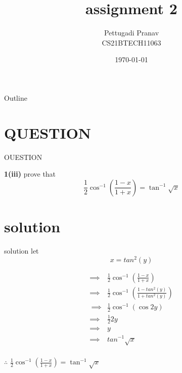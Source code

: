 \documentclass{beamer}
\title{assignment 2}
\author{Pettugadi Pranav\\CS21BTECH11063}
\date{\today}
\providecommand{\brak}[1]{\ensuremath{\left(#1\right)}}
\begin{document}
\begin{frame}
    \titlepage 
\end{frame}

\logo{}


\begin{frame}{Outline}
    \tableofcontents
\end{frame}


\section{QUESTION}
\begin{frame}{OUESTION}
\begin{block}{\textbf{1(iii)}}
        prove that $$\frac{1}{2}\cos^{-1}\brak{\frac{1-x}{1+x}} = \tan^{-1}{\sqrt{x}}$$
    \end{block}

\end{frame}
\section{solution}
\begin{frame}{solution}
let$$ x= tan^2(y)$$

\begin{align*}
\implies&\frac{1}{2}\cos^{-1}\brak{\frac{1-x}{1+x}}\\
\implies&\frac{1}{2}\cos^{-1}\brak{\frac{1-tan^2(y)}{1+tan^2(y)}}\\\
\implies&\frac{1}{2}\cos^{-1}({\cos{2y}})\\
\implies&\frac{1}{2} 2y\\
\implies&y\\
\implies&tan^{-1}\sqrt{x}\\
\end{align*}
\end{frame}
\begin{frame}
$\therefore$ $\frac{1}{2}\cos^{-1}\brak{\frac{1-x}{1+x}} = \tan^{-1}{\sqrt{x}}$

\end{frame} 
\end{document}
